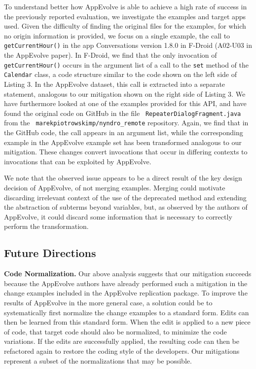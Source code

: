 To understand better how AppEvolve is able to achieve a high rate of
success in the previously reported evaluation, we investigate the examples
and target apps used.  Given the difficulty of finding the original files
for the examples, for which no origin information is provided, we focus on
a single example, the call to {\tt getCurrentHour()} in the app {\sc
  Conversations} version 1.8.0 in F-Droid (A02-U03 in the AppEvolve paper).
In F-Droid, we find that the only invocation of {\tt getCurrentHour()}
occurs in the argument list of a call to the {\tt set} method of the {\tt
  Calendar} class, a code structure similar to the code shown on the left
side of Listing 3.  In the AppEvolve dataset, this call is extracted into a
separate statement, analogous to our mitigation shown on the right side of
Listing 3.  We have furthermore looked at one of the examples provided for
this API, and have found the original code on GitHub in the file {\tt
  RepeaterDialogFragment.java} from the {\tt
  marekpiotrowskimp/nyndro\_remote} repository.  Again, we find that in the
GitHub code, the call appears in an argument list, while the corresponding
example in the AppEvolve example set has been transformed analogous to our
mitigation.  These changes convert invocations that occur in differing
contexts to invocations that can be exploited by AppEvolve.

We note that the observed issue appears to be a direct result of the key
design decision of AppEvolve, of not merging examples.  Merging could
motivate discarding irrelevant context of the use of the deprecated method
and extending the abstraction of subterms beyond variables, but, as observed
by the authors of AppEvolve, it could discard some information
that is necessary to correctly perform the transformation.

\subsection{Future Directions}

\noindent
{\bf Code Normalization.}
Our above analysis suggests that our mitigation succeeds because the
AppEvolve authors have already performed such a mitigation in the change
examples included in the AppEvolve replication package.  To improve the
results of AppEvolve in the more general case, a solution could be to
systematically first normalize the change examples to a standard form.
Edits can then be learned from this standard form. When the edit is applied
to a new piece of code, that target code should also be normalized, to
minimize the code variations. If the edits are successfully applied, the
resulting code can then be refactored again to restore the coding style of
the developers.  Our mitigations represent a subset of the normalizations
that may be possible.

